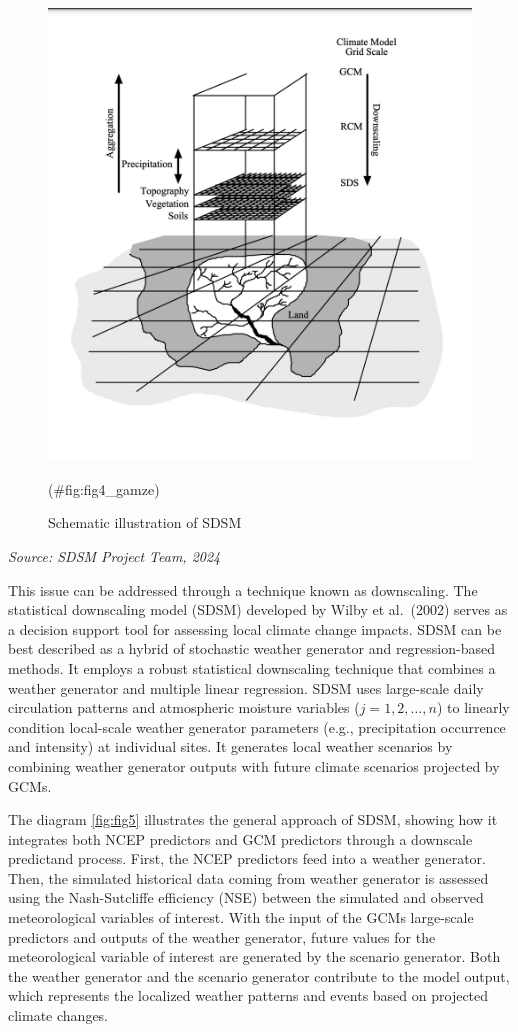 \documentclass[
]{krantz}
\begin{document}
\begin{figure}

{\centering \includegraphics[width=0.8\linewidth]{./work/06-lowflow/figures/Figure_4} 

}

\caption{Schematic illustration of SDSM}(\#fig:fig4\_gamze)
\end{figure}

\emph{Source: SDSM Project Team, 2024}

This issue can be addressed through a technique known as downscaling. The statistical downscaling model (SDSM) developed by Wilby et al.~(2002) serves as a decision support tool for assessing local climate change impacts. SDSM can be best described as a hybrid of stochastic weather generator and regression-based methods. It employs a robust statistical downscaling technique that combines a weather generator and multiple linear regression. SDSM uses large-scale daily circulation patterns and atmospheric moisture variables (\(j = 1, 2, \ldots, n\)) to linearly condition local-scale weather generator parameters (e.g., precipitation occurrence and intensity) at individual sites. It generates local weather scenarios by combining weather generator outputs with future climate scenarios projected by GCMs.

The diagram \ref{fig:fig5} illustrates the general approach of SDSM, showing how it integrates both NCEP predictors and GCM predictors through a downscale predictand process. First, the NCEP predictors feed into a weather generator. Then, the simulated historical data coming from weather generator is assessed using the Nash-Sutcliffe efficiency (NSE) between the simulated and observed meteorological variables of interest. With the input of the GCMs large-scale predictors and outputs of the weather generator, future values for the meteorological variable of interest are generated by the scenario generator. Both the weather generator and the scenario generator contribute to the model output, which represents the localized weather patterns and events based on projected climate changes.
\end{document}

